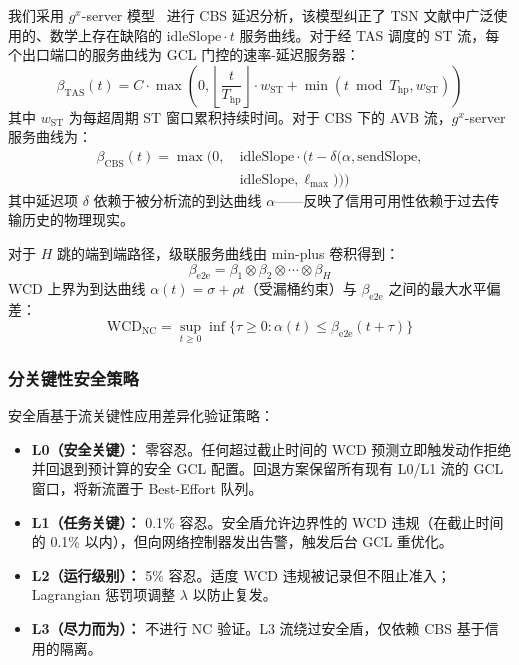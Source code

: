 \documentclass[UTF8]{ctexart}
\begin{document}
我们采用 $g^x$-server 模型~\cite{jiang2024ncrevisit} 进行 CBS 延迟分析，该模型纠正了 TSN 文献中广泛使用的、数学上存在缺陷的 $\text{idleSlope}\cdot t$ 服务曲线。对于经 TAS 调度的 ST 流，每个出口端口的服务曲线为 GCL 门控的速率-延迟服务器：
\begin{equation}
\beta_{\text{TAS}}(t) = C \cdot \max\left(0, \left\lfloor\frac{t}{T_{\text{hp}}}\right\rfloor \cdot w_{\text{ST}} + \min(t \bmod T_{\text{hp}}, w_{\text{ST}})\right)
\end{equation}
其中 $w_{\text{ST}}$ 为每超周期 ST 窗口累积持续时间。对于 CBS 下的 AVB 流，$g^x$-server 服务曲线为：
\begin{equation}
\begin{split}
\beta_{\text{CBS}}(t) = \max\Big(0,\ & \text{idleSlope} \cdot (t - \delta(\alpha, \text{sendSlope},\\
& \text{idleSlope}, \ell_{\max}))\Big)
\end{split}
\end{equation}
其中延迟项 $\delta$ 依赖于被分析流的到达曲线 $\alpha$——反映了信用可用性依赖于过去传输历史的物理现实。

对于 $H$ 跳的端到端路径，级联服务曲线由 min-plus 卷积得到：
\begin{equation}
\beta_{\text{e2e}} = \beta_1 \otimes \beta_2 \otimes \cdots \otimes \beta_H
\end{equation}
WCD 上界为到达曲线 $\alpha(t) = \sigma + \rho t$（受漏桶约束）与 $\beta_{\text{e2e}}$ 之间的最大水平偏差：
\begin{equation}
\text{WCD}_{\text{NC}} = \sup_{t \geq 0} \inf\{\tau \geq 0 : \alpha(t) \leq \beta_{\text{e2e}}(t + \tau)\}
\end{equation}

\subsubsection{分关键性安全策略}

安全盾基于流关键性应用差异化验证策略：

\begin{itemize}
\item \textbf{L0（安全关键）：} 零容忍。任何超过截止时间的 WCD 预测立即触发动作拒绝并回退到预计算的安全 GCL 配置。回退方案保留所有现有 L0/L1 流的 GCL 窗口，将新流置于 Best-Effort 队列。
\item \textbf{L1（任务关键）：} 0.1\% 容忍。安全盾允许边界性的 WCD 违规（在截止时间的 0.1\% 以内），但向网络控制器发出告警，触发后台 GCL 重优化。
\item \textbf{L2（运行级别）：} 5\% 容忍。适度 WCD 违规被记录但不阻止准入；Lagrangian 惩罚项调整 $\lambda$ 以防止复发。
\item \textbf{L3（尽力而为）：} 不进行 NC 验证。L3 流绕过安全盾，仅依赖 CBS 基于信用的隔离。
\end{itemize}
\end{document}
